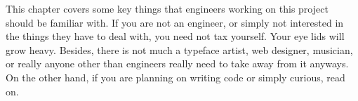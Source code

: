 

This chapter covers some key things that engineers working on this project should be familiar with. If you are not an engineer, or simply not interested in the things they have to deal with, you need not tax yourself. Your eye lids will grow heavy. Besides, there is not much a typeface artist, web designer, musician, or really anyone other than engineers really need to take away from it anyways. On the other hand, if you are planning on writing code or simply curious, read on.






\StopChapter

